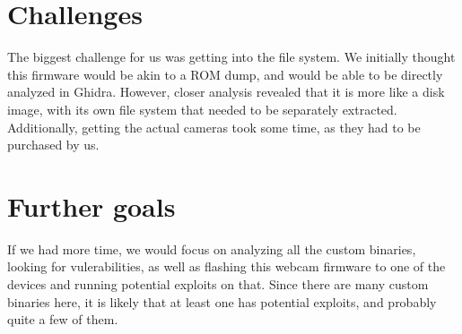 \documentclass[a4paper, 11pt]{article}
\begin{document}
\section{Challenges}
The biggest challenge for us was getting into the file system. We initially thought this firmware would be akin to a ROM dump, and would be able to be directly analyzed in Ghidra. However, closer analysis revealed that it is more like a disk image, with its own file system that needed to be separately extracted. Additionally, getting the actual cameras took some time, as they had to be purchased by us.
\section{Further goals}
If we had more time, we would focus on analyzing all the custom binaries, looking for vulerabilities, as well as flashing this webcam firmware to one of the devices and running potential exploits on that. Since there are many custom binaries here, it is likely that at least one has potential exploits, and probably quite a few of them.
\end{document}
